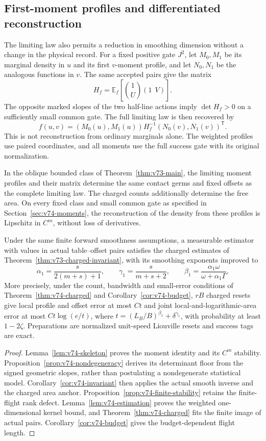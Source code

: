 \subsection{First-moment profiles and differentiated reconstruction}

The limiting law also permits a reduction in smoothing dimension without
a change in the physical record.  For a fixed positive gate $J^2$,
let $M_0,M_1$ be its marginal density in $u$ and its first $v$-moment
profile, and let $N_0,N_1$ be the analogous functions in $v$.
The same accepted pairs give the matrix
\[
 H_f=\mathbb E_f\!\left[\binom{1}{U}(1\ \ V)\right].
\]
The opposite marked slopes of the two half-line actions imply
$\det H_f>0$ on a sufficiently small common gate.  The full limiting
law is then recovered by
\[
       f(u,v)=(M_0(u),M_1(u))H_f^{-1}
                                (N_0(v),N_1(v))^{\mathsf T}.
\]
This is not reconstruction from ordinary marginals alone.  The weighted
profiles use paired coordinates, and all moments use the full success
gate with its original normalization.

\begin{theorem}
\label{thm:v74-main}
In the oblique bounded class of Theorem~\ref{thm:v73-main}, the
limiting moment profiles and their matrix determine the same contact
germs and fixed offsets as the complete limiting law.  The charged
counts additionally determine the free area.  On every fixed class and
small common gate as specified in Section~\ref{sec:v74-moments},
the reconstruction of the density from these profiles is Lipschitz
in $C^m$, without loss of derivatives.

Under the same finite forward smoothness assumptions, a measurable
estimator with values in actual table--offset pairs satisfies the
charged estimates of Theorem~\ref{thm:v73-charged-invariant}, with
its smoothing exponents improved to
\[
 \alpha_1=\frac{s}{2(m+s)+1},\qquad
 \gamma_1=\frac{s}{m+s+2},\qquad
 \beta_1=\frac{\alpha_1\omega}{\omega+\alpha_1\Gamma}.
\]
More precisely, under the count, bandwidth and small-error conditions
of Theorem~\ref{thm:v74-charged} and Corollary~\ref{cor:v74-budget},
$rB$ charged resets give local profile and offset error at most $Ct$
and joint local-and-logarithmic-area error at most $Ct\log(e/t)$,
where $t=(L_B/B)^{\beta_1}+\delta^{\gamma_1}$, with probability at
least $1-2\zeta$.  Preparations are normalized unit-speed Liouville
resets and success tags are exact.
\end{theorem}
\begin{proof}
Lemma~\ref{lem:v74-skeleton} proves the moment identity and its
$C^m$ stability.  Proposition~\ref{prop:v74-nondegeneracy} derives
its determinant floor from the signed geometric slopes, rather than
postulating a nondegenerate statistical model.  Corollary~\ref{cor:v74-invariant}
then applies the actual smooth inverse and the charged area anchor.
Proposition~\ref{prop:v74-finite-stability} retains the finite-flight
rank defect.  Lemma~\ref{lem:v74-estimation} proves the weighted
one-dimensional kernel bound, and Theorem~\ref{thm:v74-charged}
fits the finite image of actual pairs.  Corollary~\ref{cor:v74-budget}
gives the budget-dependent flight length.
\end{proof}


